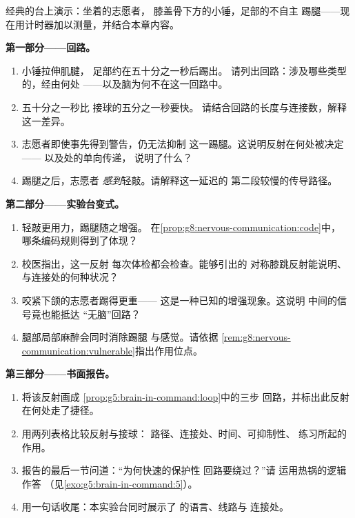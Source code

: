 \begin{problem}\label{pb:g8:nervous-communication:1}
经典的台上演示：坐着的志愿者，
膝盖骨下方的小锤，足部的不自主
踢腿——现在用计时器加以测量，并结合本章内容。

\medskip\noindent\textbf{第一部分——回路。}
\begin{enumerate}
  \item 小锤拉伸肌腱，
        足部约在五十分之一秒后踢出。
        请列出回路：涉及哪些类型的，经由何处
        ——以及脑为何不在这一回路中。
  \item 五十分之一秒比
        接球的五分之一秒要快。
        请结合回路的长度与连接数，解释这一差异。
  \item 志愿者即使事先得到警告，仍无法抑制
        这一踢腿。这说明反射在何处被决定——
        以及处的单向传递，
        说明了什么？
  \item 踢腿之后，志愿者
        \emph{感到}轻敲。请解释这一延迟的
        第二段较慢的传导路径。
\end{enumerate}

\medskip\noindent\textbf{第二部分——实验台变式。}
\begin{enumerate}[resume]
  \item 轻敲更用力，踢腿随之增强。
        在\cref{prop:g8:nervous-communication:code}中，
        哪条编码规则得到了体现？
  \item 校医指出，这一反射
        每次体检都会检查。能够引出的
        对称膝跳反射能说明、
        与连接处的何种状况？
  \item 咬紧下颌的志愿者踢得更重——
        这是一种已知的增强现象。这说明
        中间的信号竟也能抵达
        “无脑”回路？
  \item 腿部局部麻醉会同时消除踢腿
        与感觉。请依据
        \cref{rem:g8:nervous-communication:vulnerable}指出作用位点。
\end{enumerate}

\medskip\noindent\textbf{第三部分——书面报告。}
\begin{enumerate}[resume]
  \item 将该反射画成
        \cref{prop:g5:brain-in-command:loop}中的三步
        回路，并标出此反射在何处走了捷径。
  \item 用两列表格比较反射与接球：
        路径、连接处、时间、可抑制性、
        练习所起的作用。
  \item 报告的最后一节问道：“为何快速的保护性
        回路要绕过？”请
        运用热锅的逻辑作答
        （见\cref{exo:g5:brain-in-command:5}）。
  \item 用一句话收尾：本实验台同时展示了
        的语言、线路与
        连接处。
\end{enumerate}
\end{problem}
